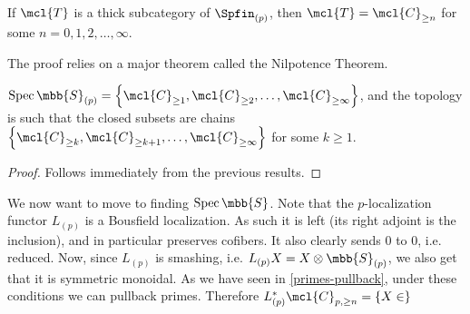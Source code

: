 \begin{theorem}
	If $\mcl{T}$ is a thick subcategory of $\Spfin_{\left(p\right)}$, then $\mcl{T} = \mcl{C}_{\geq n}$ for some $n = 0,1,2,\dotsc,\infty$.
\end{theorem}

\begin{remark*}
	The proof relies on a major theorem called the Nilpotence Theorem.
\end{remark*}

\begin{corollary}
	$\spec \mbb{S}_{\left(p\right)} = \left\{ \mcl{C}_{\geq 1}, \mcl{C}_{\geq 2}, \dotsc, \mcl{C}_{\geq \infty} \right\}$,
	and the topology is such that the closed subsets are chains
	$\left\{ \mcl{C}_{\geq k}, \mcl{C}_{\geq k+1}, \dotsc, \mcl{C}_{\geq \infty} \right\}$
	for some $k \geq 1$.
\end{corollary}

\begin{proof}
	Follows immediately from the previous results.
\end{proof}

We now want to move to finding $\spec \mbb{S}$.
Note that the $p$-localization functor $L_{\left(p\right)}$ is a Bousfield localization.
As such it is left (its right adjoint is the inclusion), and in particular preserves cofibers.
It also clearly sends $0$ to $0$, i.e. reduced.
Now, since $L_{\left(p\right)}$ is smashing, i.e. $L_{\left(p\right)} X = X \otimes \mbb{S}_{\left(p\right)}$, we also get that it is symmetric monoidal.
As we have seen in \ref{primes-pullback}, under these conditions we can pullback primes.
Therefore
$
L_{\left(p\right)}^* \mcl{C}_{p, \geq n}
=
\left\{
	X \in
\right\}
$
